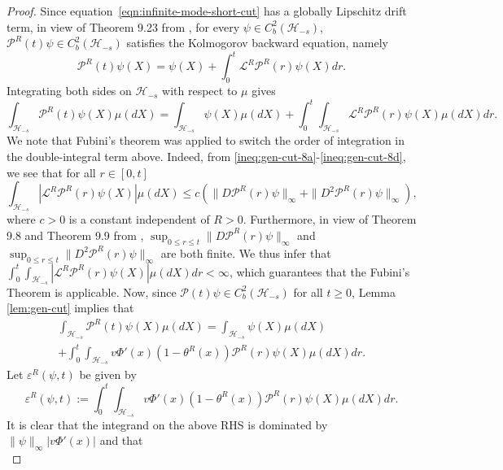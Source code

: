 \documentclass[11pt]{amsart}
\theoremstyle{definition}
\renewcommand{\L}{\mathcal{L}}
\renewcommand{\H}{\mathcal{H}}
\newcommand{\PMarkov}{\mathcal{P}}
\theoremstyle{definition}
\theoremstyle{plain}
\numberwithin{equation}{section}
\begin{document}
\begin{proof} Since equation~\eqref{eqn:infinite-mode-short-cut} has a globally Lipschitz drift term, in view of Theorem 9.23 from \cite{da2014stochastic}, for every $\psi\in C^2_b(\H_{-s})$, $\PMarkov^R(t)\psi\in  C_b^2(\H_{-s})$ satisfies the Kolmogorov backward equation, namely
\begin{equation}\label{eqn:density-0}
\PMarkov^R(t)\psi(X)=\psi(X)+\int_0^t\L^R\PMarkov^R(r)\psi(X)dr.
\end{equation}
Integrating both sides on $\H_{-s}$ with respect to $\mu$ gives
\begin{equation}\label{eqn:density-1}
\int_{\mathcal{H}_{-s}}\!\!\!\!\PMarkov^R(t)\psi(X)\mu(dX)=\int_{\mathcal{H}_{-s}}\!\!\!\!\psi(X)\mu(dX)+\int_0^t\int_{\mathcal{H}_{-s}}\!\!\!\!\L^R\PMarkov^R(r)\psi(X)\mu(dX)dr.
\end{equation}
We note that Fubini's theorem was applied to switch the order of integration in the double-integral term above. Indeed, from \eqref{ineq:gen-cut-8a}-\eqref{ineq:gen-cut-8d}, we see that for all $r\in[0,t]$
\begin{equation*}
\int_{\mathcal{H}_{-s}}\!\!\!\!\left|\L^R\PMarkov^R(r)\psi(X)\right|\mu(dX)\leq c \left(\| D\PMarkov^R(r)\psi\|_\infty+\| D^2\PMarkov^R(r)\psi\|_\infty\right),
\end{equation*}
where $c>0$ is a constant independent of $R>0$. Furthermore, in view of Theorem 9.8 and Theorem 9.9 from \cite{da2014stochastic}, $\sup_{0\leq r\leq t}\|  D\PMarkov^R(r)\psi\|_\infty$ and $\sup_{0\leq r\leq t}\|  D^2\PMarkov^R(r)\psi\|_\infty$ are both finite. We thus infer that $\int_0^t\int_{\mathcal{H}_{-s}}\left|\L^R\PMarkov^R(r)\psi(X)\right|\mu(dX)dr<\infty$, which guarantees that the Fubini's Theorem is applicable. Now, since $\PMarkov(t)\psi\in C^2_b(\H_{-s})$ for all $t\geq 0$, Lemma \ref{lem:gen-cut} implies that
\begin{multline}\label{eqn:density-1a}
\int_{\mathcal{H}_{-s}}\!\!\!\!\PMarkov^R(t)\psi(X)\mu(dX)=\int_{\mathcal{H}_{-s}}\!\!\!\!\psi(X)\mu(dX)\\
+\int_0^t\int_{\mathcal{H}_{-s}}\!\!\!\!v\Phi'(x)\left(1-\theta^R(x)\right)\PMarkov^R(r)\psi(X)\mu(dX)dr.
\end{multline}
Let $\varepsilon^R(\psi,t)$ be given by
\begin{equation} \label{eqn:density-1b}
\varepsilon^R(\psi,t) := \int_0^t\int_{\mathcal{H}_{-s}}\!\!\!\!v\Phi'(x)\left(1-\theta^R(x)\right)\PMarkov^R(r)\psi(X)\mu(dX)dr.
\end{equation}
It is clear that the integrand on the above RHS is dominated by $\|\psi\|_{\infty}\left|v\Phi'(x)\right|$ and that \begin{equation*}

\end{equation*}
\end{proof}
\end{document}
